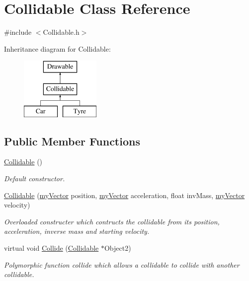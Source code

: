 \hypertarget{class_collidable}{}\section{Collidable Class Reference}
\label{class_collidable}


{\ttfamily \#include $<$Collidable.\+h$>$}

Inheritance diagram for Collidable\+:\begin{figure}[H]
\begin{center}
\leavevmode
\includegraphics[height=3.000000cm]{class_collidable}
\end{center}
\end{figure}
\subsection*{Public Member Functions}
\begin{DoxyCompactItemize}
\item 
\hyperlink{class_collidable_a92ce9e2b08086bb2f466168ffc69c9ed}{Collidable} ()
\begin{DoxyCompactList}\small\item\em Default constructor. \end{DoxyCompactList}\item 
\hyperlink{class_collidable_ad2dd423735fd869f76c55df162d6eff2}{Collidable} (\hyperlink{classmy_vector}{my\+Vector} position, \hyperlink{classmy_vector}{my\+Vector} acceleration, float inv\+Mass, \hyperlink{classmy_vector}{my\+Vector} velocity)
\begin{DoxyCompactList}\small\item\em Overloaded constructer which contructs the collidable from its position, acceleration, inverse mass and starting velocity. \end{DoxyCompactList}\item 
virtual void \hyperlink{class_collidable_abfe491d3368cfc9c1407b91b4d5d3d77}{Collide} (\hyperlink{class_collidable}{Collidable} $\ast$Object2)
\begin{DoxyCompactList}\small\item\em Polymorphic function collide which allows a collidable to collide with another collidable. \end{DoxyCompactList}\end{DoxyCompactItemize}
